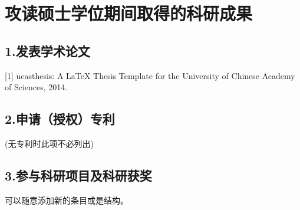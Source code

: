 \chapter{攻读硕士学位期间取得的科研成果}\label{achievement}


\section*{1.发表学术论文}

[1] ucasthesis: A LaTeX Thesis Template for the University of Chinese Academy of Sciences, 2014.


\section*{2.申请（授权）专利}

(无专利时此项不必列出)

\section*{3.参与科研项目及科研获奖 }

可以随意添加新的条目或是结构。


\cleardoublepage[plain]%
